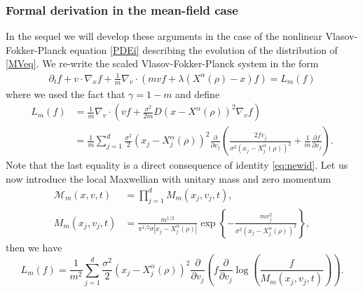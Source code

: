\documentclass{ims9x6}
\begin{document}
\subsubsection{Formal derivation in the mean-field case}
In the sequel we will develop these arguments in the case of the nonlinear Vlasov-Fokker-Planck equation \eqref{PDEi} describing the evolution of the distribution of \eqref{MVeq}. 
We re-write the scaled Vlasov-Fokker-Planck system in the form
\begin{equation}\label{PDEis}
\begin{split}
\partial_t f + v \cdot \nabla_x f + 
\frac1{m}\nabla_v\cdot\left(m  v f + \lambda (X^{\alpha}(\rho)-x)f\right)= L_{m}(f)
\end{split}
\end{equation}
where we used the fact that $\gamma=1-m$ and define
\[
\begin{split}
L_{m}(f)&=\frac1{m}\nabla_v\cdot\left(v f + \frac{\sigma^2}{2m} D(x - X^{\alpha}(\rho) )^2\nabla_v f\right)\\
&= \frac1{m} \sum_{j=1}^d \frac{\sigma^2}{2} (x_j - X^{\alpha}_j(\rho))^2 \frac{\partial}{\partial v_j}\left(\frac{2 f v_j}{\sigma^2(x_j - X^{\alpha}_j(\rho))^2} + \frac1{m}\frac{\partial f}{\partial v_j}\right).
\end{split}
\]
{Note that the last equality is a direct consequence of identity \eqref{eq:newid}}.
Let us now introduce the local Maxwellian with unitary mass and zero momentum
\[
\begin{split}
{\mathcal M}_m(x,v,t)&= \prod_{j=1}^d M_{m}(x_j,v_j,t), \\
M_{m}(x_j,v_j,t) &= \frac{m^{1/2}}{\pi^{1/2}\sigma |x_j-X^\alpha_j(\rho)|} 
\exp\left\{-\frac{m v_j^2}{\sigma^2(x_j-X^\alpha_j(\rho))^2}\right\},
\end{split}
\]
then we have
\[
L_{m}(f) = \frac1{m^2 }\sum_{j=1}^d \frac{\sigma^2}{2} (x_j - X^{\alpha}_j(\rho))^2 \frac{\partial}{\partial v_j}\left(f\frac{\partial}{\partial v_j}\log\left(\frac{f}{M_{m}(x_j,v_j,t)}\right)\right).
\]
\end{document}
